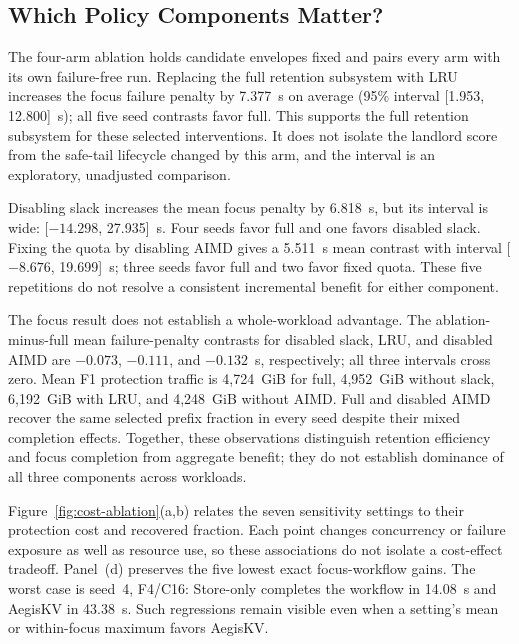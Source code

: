 \subsection{Which Policy Components Matter?}
\label{sec:ablation-results}


The four-arm ablation holds candidate envelopes fixed and pairs every arm
with its own failure-free run. Replacing the full retention subsystem with
LRU increases the focus failure penalty by 7.377~s on average (95\% interval
[1.953, 12.800]~s); all five seed contrasts favor full. This supports the
full retention subsystem for these selected interventions. It does not
isolate the landlord score from the safe-tail lifecycle changed by this arm,
and the interval is an exploratory, unadjusted comparison.

Disabling slack increases the mean focus penalty by 6.818~s, but its interval
is wide: [$-14.298$, 27.935]~s. Four seeds favor full and one favors disabled
slack. Fixing the quota by disabling AIMD gives a 5.511~s mean contrast with
interval [$-8.676$, 19.699]~s; three seeds favor full and two favor fixed
quota. These five repetitions do not resolve a consistent incremental benefit
for either component.

The focus result does not establish a whole-workload advantage. The
ablation-minus-full mean failure-penalty contrasts for disabled slack, LRU,
and disabled AIMD are $-0.073$, $-0.111$, and $-0.132$~s, respectively; all
three intervals cross zero. Mean F1 protection traffic is 4,724~GiB for full,
4,952~GiB without slack, 6,192~GiB with LRU, and 4,248~GiB without AIMD.
Full and disabled AIMD recover the same selected prefix fraction in every
seed despite their mixed completion effects. Together, these observations
distinguish retention efficiency and focus completion from aggregate benefit;
they do not establish dominance of all three components across workloads.

Figure~\ref{fig:cost-ablation}(a,b) relates the seven sensitivity settings to
their protection cost and recovered fraction. Each point changes concurrency
or failure exposure as well as resource use, so these associations do not
isolate a cost-effect tradeoff. Panel~(d) preserves the five lowest exact
focus-workflow gains. The worst case is seed~4, F4/C16: Store-only completes
the workflow in 14.08~s and AegisKV in 43.38~s. Such regressions remain visible
even when a setting's mean or within-focus maximum favors AegisKV.
